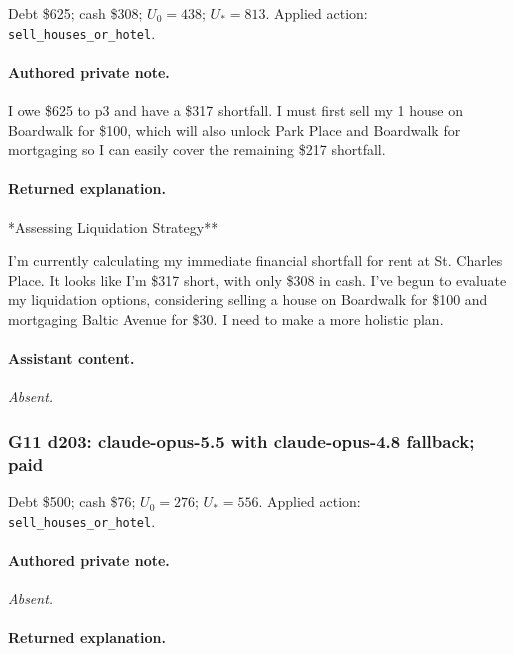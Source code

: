 Debt \$625; cash \$308; $U_0=438$; $U_*=813$. Applied action: \texttt{sell\_houses\_or\_hotel}.

\paragraph{Authored private note.}

{\small I owe \$625 to p3 and have a \$317 shortfall. I must first sell my 1 house on Boardwalk for \$100, which will also unlock Park Place and Boardwalk for mortgaging so I can easily cover the remaining \$217 shortfall.\par}

\paragraph{Returned explanation.}

{\small **Assessing Liquidation Strategy**
\par
I'm currently calculating my immediate financial shortfall for rent at St. Charles Place. It looks like I'm \$317 short, with only \$308 in cash. I've begun to evaluate my liquidation options, considering selling a house on Boardwalk for \$100 and mortgaging Baltic Avenue for \$30. I need to make a more holistic plan.
\par

\par}

\paragraph{Assistant content.}

\textit{Absent.}

\medskip

\subsubsection*{G11 d203: claude-opus-5.5 with claude-opus-4.8 fallback; paid}

Debt \$500; cash \$76; $U_0=276$; $U_*=556$. Applied action: \texttt{sell\_houses\_or\_hotel}.

\paragraph{Authored private note.}

\textit{Absent.}

\paragraph{Returned explanation.}

